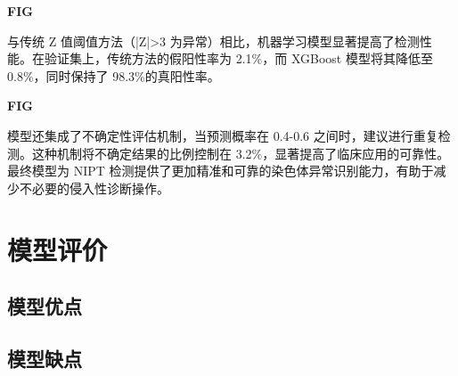 \documentclass[withoutpreface,bwprint]{cumcmthesis} %
\begin{document}
\textbf{FIG}

与传统 Z 值阈值方法（|Z|>3 为异常）相比，机器学习模型显著提高了检测性能。在验证集上，传统方法的假阳性率为 2.1\%，而 XGBoost 模型将其降低至 0.8\%，同时保持了 98.3\%的真阳性率。

\textbf{FIG}

模型还集成了不确定性评估机制，当预测概率在 0.4-0.6 之间时，建议进行重复检测。这种机制将不确定结果的比例控制在 3.2\%，显著提高了临床应用的可靠性。最终模型为 NIPT 检测提供了更加精准和可靠的染色体异常识别能力，有助于减少不必要的侵入性诊断操作。

\section{模型评价}
\subsection{模型优点}

\subsection{模型缺点}




\begin{appendices}
\end{appendices}
\end{document}
